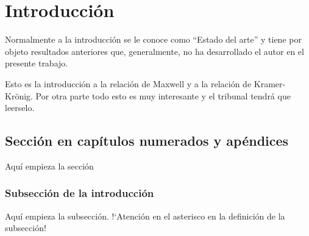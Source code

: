 \chapter{Introducción}
\graphicspath{{figuras/int/}}
\label{cap:introd}


Normalmente a la introducción se le conoce como ``Estado del arte'' y tiene por objeto resultados anteriores que, generalmente, no ha desarrollado el autor en el presente trabajo.

Esto es la introducción a la relación de Maxwell y a la relación de Kramer-Krönig. Por otra parte todo esto es muy interesante y el tribunal tendrá que leerselo.


\section{Sección en capítulos numerados y apéndices}

Aquí empieza la sección

\subsection*{Subsección de la introducción}

Aquí empieza la subsección. !`Atención en el asterisco en la definición de la subsección!
